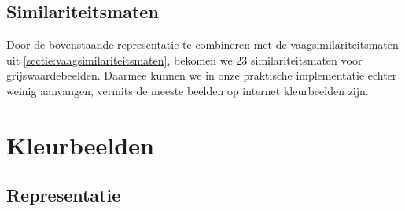 \subsection{Similariteitsmaten}

Door de bovenstaande representatie te combineren met de vaagsimilariteitsmaten uit 
\ref{sectie:vaagsimilariteitsmaten}, bekomen we 23 similariteitsmaten voor grijswaardebeelden.
Daarmee kunnen we in onze praktische implementatie echter weinig aanvangen, vermits de
meeste beelden op internet kleurbeelden zijn. 


\section{Kleurbeelden}
\label{sectie:pixelgeb_kleurbeelden}

\subsection{Representatie}
\label{sectie:kleurbeeld_repr}

